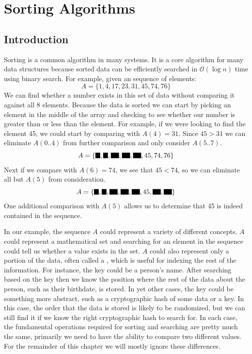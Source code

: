 
\chapter{Sorting Algorithms}
\glsresetall
\label{chapter:sorting}

\section{Introduction}
\label{sec:sorting_introduction}

Sorting is a common algorithm in many systems.  It is a core algorithm for many data structures because sorted data can be efficiently searched in $\mathcal{O}(\log n)$ time using binary search.  For example, given an sequence of elements:
\begin{equation}
A = \{1,4,17,23,31,45,74,76\}
\end{equation}
We can find whether a number exists in this set of data without comparing it against all 8 elements.  Because the data is sorted we can start by picking an element in the middle of the array and checking to see whether our number is greater than or less than the element.  For example, if we were looking to find the element 45, we could start by comparing with $A(4) = 31$.  Since $45 > 31$ we can eliminate $A(0..4)$ from further comparison and only consider $A(5..7)$. 
\begin{equation}
\setlength{\fboxsep}{1pt}
A = \{\colorbox{black}{1},\colorbox{black}{4},\colorbox{black}{17},\colorbox{black}{23},\colorbox{black}{31},45,74,76\}
\end{equation}
Next if we compare with $A(6) = 74$, we see that $45 < 74$, so we can eliminate all but $A(5)$ from consideration. 
\begin{equation}
\setlength{\fboxsep}{1pt}
A = \{\colorbox{black}{1},\colorbox{black}{4},\colorbox{black}{17},\colorbox{black}{23},\colorbox{black}{31},45,\colorbox{black}{74},\colorbox{black}{76}\}
\end{equation}
 One additional comparison with $A(5)$ allows us to determine that 45 is indeed contained in the sequence.

In our example, the sequence $A$ could represent a variety of different concepts.  $A$ could represent a mathematical set and searching for an element in the sequence could tell us whether a value exists in the set.  $A$ could also represent only a portion of the data, often called a , which is useful for indexing the rest of the information.  For instance, the key could be a person's name.  After searching based on the key then we know the position where the rest of the data about the person, such as their birthdate, is stored.  In yet other cases, the key could be something more abstract, such as a cryptographic hash of some data or a key.  In this case, the order that the data is stored is likely to be randomized, but we can still find it if we know the right cryptographic hash to search for.  In each case, the fundamental operations required for sorting and searching are pretty much the same, primarily we need to have the ability to compare two different values.  For the remainder of this chapter we will mostly ignore these differences. 

